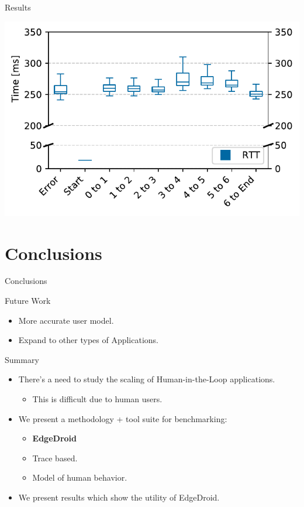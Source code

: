 \documentclass[aspectratio=1610]{beamer}
\begin{document}
\begin{frame}{Results}
\begin{center}
{            \includegraphics[width=.7\linewidth]{plots/box_taskstep.pdf}\\%
        }%
    \end{center}
\end{frame}

\section{Conclusions}
\begin{frame}{Conclusions}
    \begin{block}{Future Work}
        \begin{itemize}
            \itemsep1em
            \item More accurate user model.
            \item Expand to other types of Applications.
        \end{itemize}
    \end{block}

    \begin{block}{Summary}
        \begin{itemize}
            \itemsep1em
            \item There's a need to study the scaling of Human-in-the-Loop applications.
                  \begin{itemize}
                      \item This is difficult due to human users.
                  \end{itemize}
            \item We present a methodology + tool suite for benchmarking:
                  \begin{itemize}
                      \item \textbf{EdgeDroid}
                      \item Trace based.
                      \item Model of human behavior.
                  \end{itemize}
            \item We present results which show the utility of EdgeDroid.
        \end{itemize}
    \end{block}
\end{frame}
\end{document}
